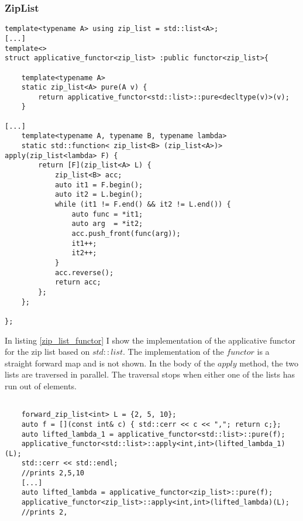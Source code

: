 \documentclass[12pt,fleqn]{article}
\begin{document}
\subsubsection{ZipList}
%   


%
%
\begin{minipage}{\linewidth}
\begin{lstlisting}[caption=ziplist is an applicative functor, label=zip_list_functor]
template<typename A> using zip_list = std::list<A>;
[...]
template<> 
struct applicative_functor<zip_list> :public functor<zip_list>{

    template<typename A>
    static zip_list<A> pure(A v) {
		return applicative_functor<std::list>::pure<decltype(v)>(v);
    }

[...]
    template<typename A, typename B, typename lambda>
    static std::function< zip_list<B> (zip_list<A>)> apply(zip_list<lambda> F) {
		return [F](zip_list<A> L) {
			zip_list<B> acc;
			auto it1 = F.begin();
			auto it2 = L.begin();
			while (it1 != F.end() && it2 != L.end()) {
				auto func = *it1;
				auto arg  = *it2;
				acc.push_front(func(arg));
				it1++;
				it2++;
			}
			acc.reverse();
			return acc;
		};
	};
	
};
\end{lstlisting}
\end{minipage}
%
%
%

In listing \ref{zip_list_functor} I show the implementation of the applicative functor for the zip list based on $std::list$. 
The implementation of the $functor$ is  a straight forward map and is not shown. 
In the body of the $apply$ method, the two lists are traversed in parallel. The traversal stops when either one of the lists has run out of elements.


%
%
%
\begin{minipage}{\linewidth}
\begin{lstlisting}[caption=the applicative functor for list and ziplist, label=exampl_list]

	forward_zip_list<int> L = {2, 5, 10};
	auto f = [](const int& c) { std::cerr << c << ","; return c;};
	auto lifted_lambda_1 = applicative_functor<std::list>::pure(f);
	applicative_functor<std::list>::apply<int,int>(lifted_lambda_1)(L);
	std::cerr << std::endl;
    //prints 2,5,10
    [...]
	auto lifted_lambda = applicative_functor<zip_list>::pure(f);
	applicative_functor<zip_list>::apply<int,int>(lifted_lambda)(L);
    //prints 2,
\end{lstlisting}
\end{minipage}
%
%
%
\end{document}
